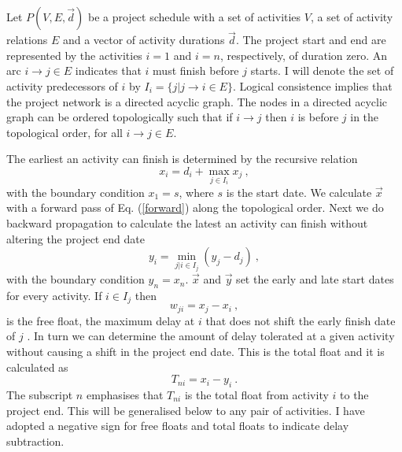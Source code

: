 \documentclass[reprint,aps,prl,amsmath,amssymb,superscriptaddress,showpacs]{revtex4-1}
\begin{document}
Let $P(V,E,\vec{d})$ be a project schedule with a set of activities $V$, a set of activity relations $E$ and a vector of activity durations $\vec{d}$. The project start and end are represented by the activities $i=1$ and $i=n$, respectively, of duration zero. An arc $i\rightarrow j\in E$ indicates that $i$ must finish before $j$ starts. I will denote the set of activity predecessors of $i$ by $I_i=\{j|j\rightarrow i\in E\}$. Logical consistence implies that the project network is a directed acyclic graph.  The nodes in a directed acyclic graph can be ordered topologically such that if $i\rightarrow j$ then $i$ is before $j$ in the topological order, for all $i\rightarrow j\in E$.

The earliest an activity can finish is determined by the recursive relation
%
\begin{equation}
x_i = d_i + \max_{j\in I_i} x_j\ ,
\label{forward} 
\end{equation}
%
with the boundary condition $x_1=s$, where $s$ is the start date. We calculate $\vec{x}$ with a forward pass of  Eq. (\ref{forward}) along the topological order. Next we do backward propagation to calculate the latest an activity can finish without altering the project end date
%
\begin{equation}
y_i = \min_{j | i \in I_j} \left(y_j - d_j\right)\ ,
\label{backward} 
\end{equation}
%
with the boundary condition $y_n=x_n$. $\vec{x}$ and $\vec{y}$ set the early and late start dates for every activity. If $i\in I_j$ then 
%
\begin{equation}
w_{ji} = x_j - x_i\ ,
\label{w}
\end{equation}
%
is the free float, the maximum delay at $i$ that does not shift the early finish date of $j$ \cite{van13}. In turn we can determine the amount of delay tolerated at a given activity without causing a shift in the project end date. This is the total float and it is calculated as
%
\begin{equation}
T_{ni} = x_i-y_i\ .
\label{Tn} 
\end{equation}
%
The subscript $n$ emphasises that $T_{ni}$ is the total float from activity $i$ to the project end. This will be generalised below to any pair of activities. I have adopted a negative sign for free floats and total floats to indicate delay subtraction.
\end{document}
